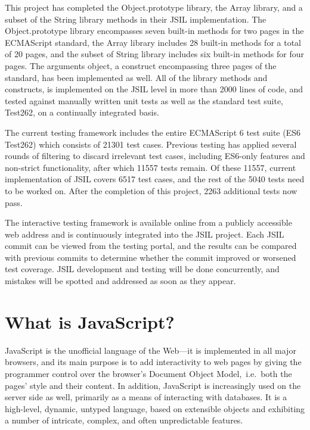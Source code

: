 \documentclass[a4paper,11pt,twoside]{report}
\begin{document}
This project has completed the Object.prototype library, the Array library, and a subset of the String library methods in their JSIL implementation. The Object.prototype library encompasses seven built-in methods for two pages in the ECMAScript standard, the Array library includes 28 built-in methods for a total of 20 pages, and the subset of String library includes six built-in methods for four pages. The arguments object, a construct encompassing three pages of the standard, has been implemented as well. All of the library methods and constructs, is implemented on the JSIL level in more than 2000 lines of code, and tested against manually written unit tests as well as the standard test suite, Test262, on a continually integrated basis.

The current testing framework includes the entire ECMAScript 6 test suite (ES6 Test262) which consists of 21301 test cases. Previous testing has applied several rounds of filtering to discard irrelevant test cases, including ES6-only features and non-strict functionality, after which 11557 tests remain. Of these 11557, current implementation of JSIL covers 6517 test cases, and the rest of the 5040 tests need to be worked on. After the completion of this project, 2263 additional tests now pass.

The interactive testing framework is available online from a publicly accessible web address and is continuously integrated into the JSIL project. Each JSIL commit can be viewed from the testing portal, and the results can be compared with previous commits to determine whether the commit improved or worsened test coverage. JSIL development and testing will be done concurrently, and mistakes will be spotted and addressed as soon as they appear.

\section{What is JavaScript?}
JavaScript is the unofficial language of the Web---it is implemented in all major browsers, and its main purpose is to add interactivity to web pages by giving the programmer control over the browser's Document Object Model,~i.e.~both the pages' style and their content. In addition, JavaScript is increasingly used on the server side as well, primarily as a means of interacting with databases. It is a high-level, dynamic, untyped language, based on extensible objects and exhibiting a number of intricate, complex, and often unpredictable features. 
\end{document}
